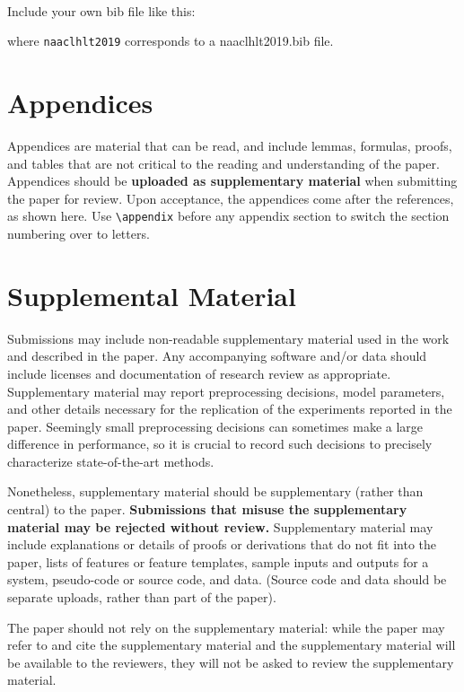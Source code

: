 \documentclass[11pt,a4paper]{article}
\begin{document}
 \\
Include your own bib file like this:
\verb||
\verb|| 

where \verb|naaclhlt2019| corresponds to a naaclhlt2019.bib file.



\appendix

\section{Appendices}
\label{sec:appendix}
Appendices are material that can be read, and include lemmas, formulas, proofs, and tables that are not critical to the reading and understanding of the paper. 
Appendices should be {\bf uploaded as supplementary material} when submitting the paper for review. Upon acceptance, the appendices come after the references, as shown here. Use
\verb|\appendix| before any appendix section to switch the section
numbering over to letters.


\section{Supplemental Material}
\label{sec:supplemental}
Submissions may include non-readable supplementary material used in the work and described in the paper. Any accompanying software and/or data should include licenses and documentation of research review as appropriate. Supplementary material may report preprocessing decisions, model parameters, and other details necessary for the replication of the experiments reported in the paper. Seemingly small preprocessing decisions can sometimes make a large difference in performance, so it is crucial to record such decisions to precisely characterize state-of-the-art methods. 

Nonetheless, supplementary material should be supplementary (rather
than central) to the paper. {\bf Submissions that misuse the supplementary 
material may be rejected without review.}
Supplementary material may include explanations or details
of proofs or derivations that do not fit into the paper, lists of
features or feature templates, sample inputs and outputs for a system,
pseudo-code or source code, and data. (Source code and data should
be separate uploads, rather than part of the paper).

The paper should not rely on the supplementary material: while the paper
may refer to and cite the supplementary material and the supplementary material will be available to the
reviewers, they will not be asked to review the
supplementary material.
\end{document}
